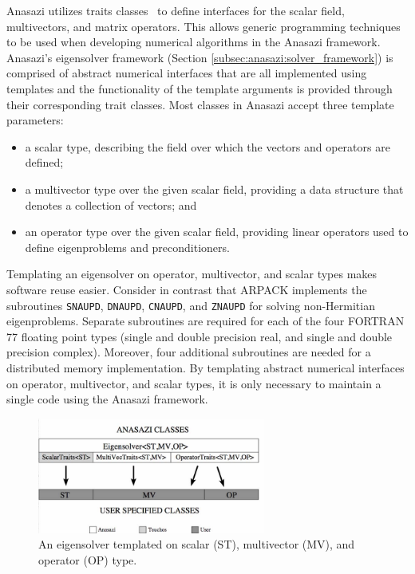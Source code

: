 \documentclass[acmtoms]{acmtrans2m}
\newcounter{algorithm}
\begin{document}
Anasazi utilizes traits classes~\cite{myer:95,veld:96} to define interfaces for the scalar field,
multivectors, and matrix operators. This allows generic programming techniques to
be used when developing numerical algorithms in the Anasazi framework.  
Anasazi's eigensolver framework (Section  
\ref{subsec:anasazi:solver_framework}) is comprised of abstract numerical interfaces
that are all implemented using templates and the functionality of the 
template arguments is provided through their corresponding trait classes.
Most classes in Anasazi accept
three template parameters:
\begin{itemize}
\item
a scalar type, describing the field over which the vectors and
operators are defined;
\item
a multivector type over the given scalar field, providing a
data structure that denotes a collection of vectors; and
\item
an operator type over the given scalar field,
providing linear operators used to define eigenproblems and
preconditioners.
\end{itemize}

Templating an eigensolver on operator, multivector, and scalar types makes software reuse
easier. Consider in contrast that ARPACK implements the subroutines \texttt{SNAUPD},
\texttt{DNAUPD}, \texttt{CNAUPD}, and \texttt{ZNAUPD} for solving non-Hermitian
eigenproblems. Separate subroutines are required for each of the four FORTRAN 77 floating
point types (single and double precision real, and single and double precision complex).
Moreover, four additional subroutines are needed for a distributed memory implementation.
By templating abstract numerical interfaces on operator, multivector, and scalar types, 
it is only necessary to maintain a single code using the Anasazi framework.

\begin{figure}[htb]
\label{fig:latemplate}
\begin{center}
\includegraphics[height=1.5in]{anasazi_linalg_template}
\end{center}
\caption{An eigensolver templated on scalar (ST), multivector (MV), and
operator (OP) type.}
\end{figure}
\end{document}
